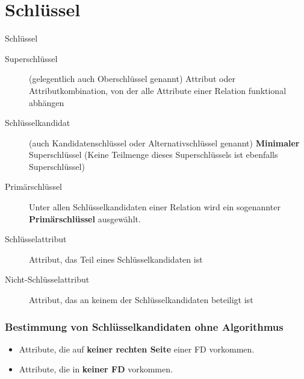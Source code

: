 \documentclass{lehramt-informatik-haupt}
\begin{document}
\let\ah=\liAttributHuelle
\let\m=\liMenge

%

\chapter{Schlüssel}

\begin{lernkartei}{Schlüssel}
\begin{description}
\item[Superschlüssel] (gelegentlich auch Oberschlüssel genannt) Attribut
oder Attributkombination, von der alle Attribute einer Relation
funktional abhängen

\item[Schlüsselkandidat] (auch Kandidatenschlüssel oder
Alternativschlüssel genannt) \textbf{Minimaler} Superschlüssel (Keine
Teilmenge dieses Superschlüssels ist ebenfalls Superschlüssel)

\item[Primärschlüssel] Unter allen Schlüsselkandidaten einer
Relation wird ein sogenannter \textbf{Primärschlüssel} ausgewählt.

\item[Schlüsselattribut] Attribut, das Teil eines
Schlüsselkandidaten ist

\item[Nicht-Schlüsselattribut] Attribut, das an keinem der
Schlüsselkandidaten beteiligt ist
\end{description}
\end{lernkartei}

%

\subsection{Bestimmung von Schlüsselkandidaten ohne Algorithmus}

\begin{itemize}
\item Attribute, die auf \textbf{keiner rechten Seite} einer FD
vorkommen.

\item Attribute, die in \textbf{keiner FD} vorkommen.
\end{itemize}
\end{document}
